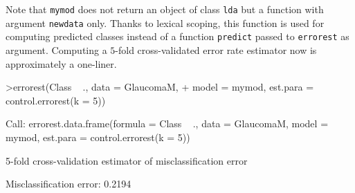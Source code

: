 \documentclass[11pt]{article}
\begin{document}
\begin{Schunk}
\end{Schunk}

Note that \texttt{mymod} does not return 
an object of class \texttt{lda} but a function
with argument \texttt{newdata} only. Thanks to lexical scoping, this 
function is used for computing
predicted classes instead of a function \texttt{predict} passed to
\texttt{errorest} as argument. Computing a $5$-fold cross-validated error rate
estimator now is approximately a one-liner.

\begin{Schunk}
\begin{Sinput}
>errorest(Class ~ ., data = GlaucomaM, 
+     model = mymod, est.para = control.errorest(k = 5))
\end{Sinput}
\begin{Soutput}
Call:
errorest.data.frame(formula = Class ~ ., data = GlaucomaM, model = mymod, 
    est.para = control.errorest(k = 5))

	 5-fold cross-validation estimator of misclassification error 

Misclassification error:  0.2194 
\end{Soutput}
\end{Schunk}
\end{document}
